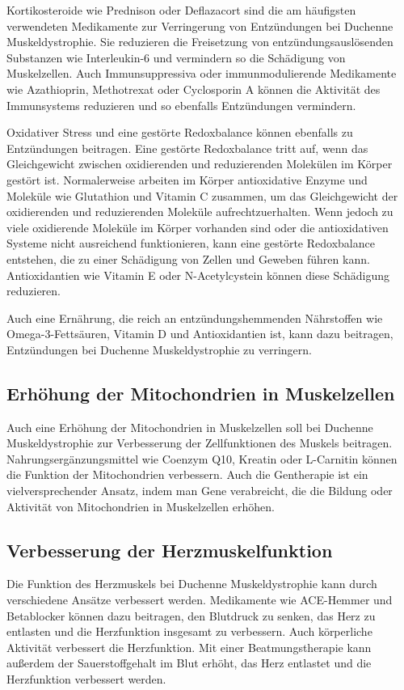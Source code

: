 \documentclass[fontsize=14pt,a4paper,headinclude,DIV=calc,automark]{scrbook}
\begin{document}
Kortikosteroide wie Prednison oder Deflazacort sind die am häufigsten verwendeten Medikamente zur Verringerung von Entzündungen bei Duchenne Muskeldystrophie. Sie reduzieren die Freisetzung von entzündungsauslösenden Substanzen wie Interleukin-6 und vermindern so die Schädigung von Muskelzellen. Auch Immunsuppressiva oder immunmodulierende Medikamente wie Azathioprin, Methotrexat oder Cyclosporin A können die Aktivität des Immunsystems reduzieren und so ebenfalls Entzündungen vermindern.

Oxidativer Stress und eine gestörte Redoxbalance können ebenfalls zu Entzündungen beitragen. Eine gestörte Redoxbalance tritt auf, wenn das Gleichgewicht zwischen oxidierenden und reduzierenden Molekülen im Körper gestört ist. Normalerweise arbeiten im Körper antioxidative Enzyme und Moleküle wie Glutathion und Vitamin C zusammen, um das Gleichgewicht der oxidierenden und reduzierenden Moleküle aufrechtzuerhalten. Wenn jedoch zu viele oxidierende Moleküle im Körper vorhanden sind oder die antioxidativen Systeme nicht ausreichend funktionieren, kann eine gestörte Redoxbalance entstehen, die zu einer Schädigung von Zellen und Geweben führen kann. Antioxidantien wie Vitamin E oder N-Acetylcystein können diese Schädigung reduzieren.

Auch eine Ernährung, die reich an entzündungshemmenden Nährstoffen wie Omega-3-Fettsäuren, Vitamin D und Antioxidantien ist, kann dazu beitragen, Entzündungen bei Duchenne Muskeldystrophie zu verringern.

\subsection{Erhöhung der Mitochondrien in Muskelzellen}

Auch eine Erhöhung der Mitochondrien in Muskelzellen soll bei Duchenne Muskeldystrophie zur Verbesserung der Zellfunktionen des Muskels beitragen. Nahrungsergänzungsmittel wie Coenzym Q10, Kreatin oder L-Carnitin können die Funktion der Mitochondrien verbessern. Auch die Gentherapie ist ein vielversprechender Ansatz, indem man Gene verabreicht, die die Bildung oder Aktivität von Mitochondrien in Muskelzellen erhöhen.

\subsection{Verbesserung der Herzmuskelfunktion}

Die Funktion des Herzmuskels bei Duchenne Muskeldystrophie kann durch verschiedene Ansätze verbessert werden. Medikamente wie ACE-Hemmer und Betablocker können dazu beitragen, den Blutdruck zu senken, das Herz zu entlasten und die Herzfunktion insgesamt zu verbessern. Auch körperliche Aktivität verbessert die Herzfunktion. Mit einer Beatmungstherapie kann außerdem der Sauerstoffgehalt im Blut erhöht, das Herz entlastet und die Herzfunktion verbessert werden.
\end{document}
